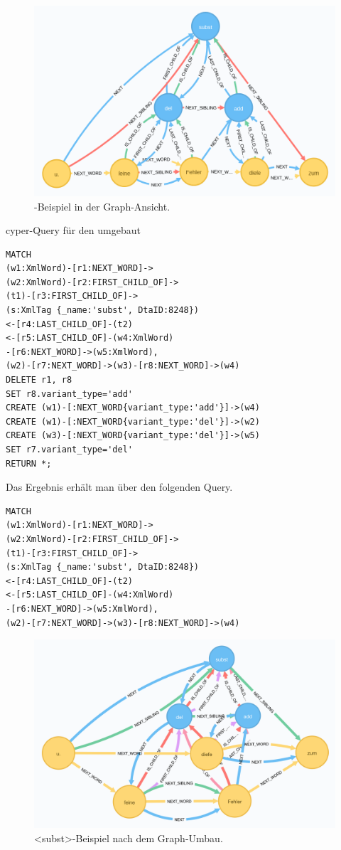 \documentclass[12pt,ngerman,]{article}
\begin{document}
\begin{figure}
\centering
\includegraphics{Bilder/TEI2Graph/subst-graph-1.png}
\caption{-Beispiel in der Graph-Ansicht.}
\end{figure}

cyper-Query für den umgebaut

\begin{verbatim}
MATCH
(w1:XmlWord)-[r1:NEXT_WORD]->
(w2:XmlWord)-[r2:FIRST_CHILD_OF]->
(t1)-[r3:FIRST_CHILD_OF]->
(s:XmlTag {_name:'subst', DtaID:8248})
<-[r4:LAST_CHILD_OF]-(t2)
<-[r5:LAST_CHILD_OF]-(w4:XmlWord)
-[r6:NEXT_WORD]->(w5:XmlWord),
(w2)-[r7:NEXT_WORD]->(w3)-[r8:NEXT_WORD]->(w4)
DELETE r1, r8
SET r8.variant_type='add'
CREATE (w1)-[:NEXT_WORD{variant_type:'add'}]->(w4)
CREATE (w1)-[:NEXT_WORD{variant_type:'del'}]->(w2)
CREATE (w3)-[:NEXT_WORD{variant_type:'del'}]->(w5)
SET r7.variant_type='del'
RETURN *;
\end{verbatim}

Das Ergebnis erhält man über den folgenden Query.

\begin{verbatim}
MATCH
(w1:XmlWord)-[r1:NEXT_WORD]->
(w2:XmlWord)-[r2:FIRST_CHILD_OF]->
(t1)-[r3:FIRST_CHILD_OF]->
(s:XmlTag {_name:'subst', DtaID:8248})
<-[r4:LAST_CHILD_OF]-(t2)
<-[r5:LAST_CHILD_OF]-(w4:XmlWord)
-[r6:NEXT_WORD]->(w5:XmlWord),
(w2)-[r7:NEXT_WORD]->(w3)-[r8:NEXT_WORD]->(w4)
\end{verbatim}

\begin{figure}
\centering
\includegraphics{Bilder/TEI2Graph/subst-add-del-bearbeitet.png}
\caption{\textless{}subst\textgreater{}-Beispiel nach dem Graph-Umbau.}
\end{figure}
\end{document}
